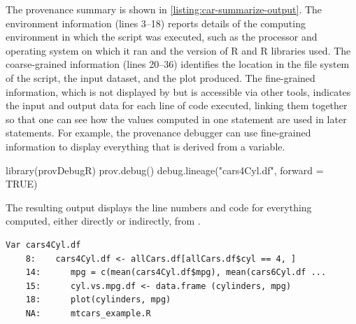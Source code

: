 

The provenance summary is shown in \autoref{listing:car-summarize-output}.
The environment information (lines 3--18) reports details of the computing environment in which the script was executed, such as the processor and operating system on which it ran and the version of R and R libraries used. The coarse-grained information (lines 20--36) identifies the location in the file system of the script, the input dataset, and the plot produced.  The fine-grained information, which is not displayed by  but is accessible via other tools, indicates the input and output data for each line of code executed, linking them together so that one can see how the values computed in one statement are used in later statements.
For example, the provenance debugger can use fine-grained information to display everything that is derived from a variable.  
\begin{example}
library(provDebugR)
prov.debug()
debug.lineage("cars4Cyl.df", forward = TRUE)
\end{example}

The resulting output 
displays the line numbers and code for everything computed, either directly or indirectly, from  .
\begin{verbatim}
Var cars4Cyl.df 
	8: 	  cars4Cyl.df <- allCars.df[allCars.df$cyl == 4, ] 
	14: 	 mpg = c(mean(cars4Cyl.df$mpg), mean(cars6Cyl.df ...
	15: 	 cyl.vs.mpg.df <- data.frame (cylinders, mpg) 
	18: 	 plot(cylinders, mpg) 
	NA: 	 mtcars_example.R 
\end{verbatim}

